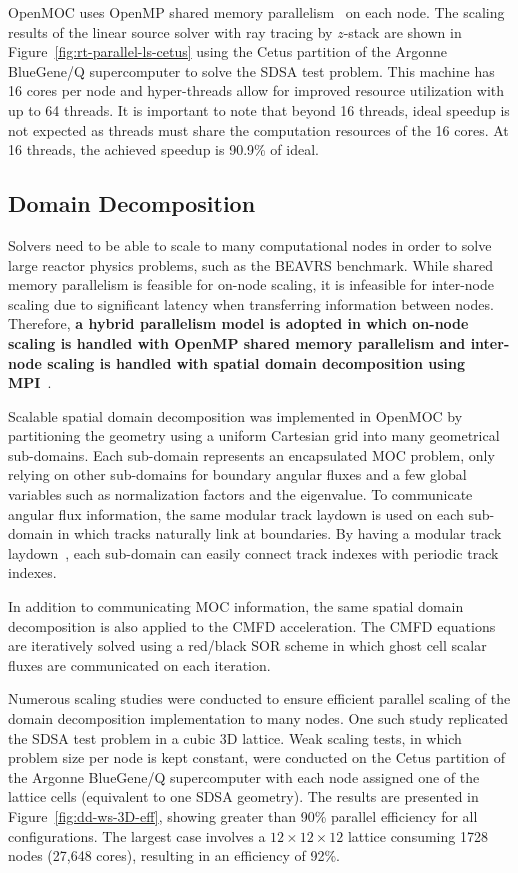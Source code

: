 \documentclass[12pt,twoside]{mitthesis-exec}
\begin{document}
OpenMOC uses OpenMP shared memory parallelism~\cite{openmp} on each node. The scaling results of the linear source solver with ray tracing by $z$-stack are shown in Figure~\ref{fig:rt-parallel-ls-cetus} using the Cetus partition of the Argonne BlueGene/Q supercomputer to solve the SDSA test problem. This machine has 16 cores per node and hyper-threads allow for improved resource utilization with up to 64 threads. It is important to note that beyond 16 threads, ideal speedup is not expected as threads must share the computation resources of the 16 cores. At 16 threads, the achieved speedup is 90.9\% of ideal.


\subsection*{Domain Decomposition}

Solvers need to be able to scale to many computational nodes in order to solve large reactor physics problems, such as the BEAVRS benchmark. While shared memory parallelism is feasible for on-node scaling, it is infeasible for inter-node scaling due to significant latency when transferring information between nodes. Therefore, \textbf{a hybrid parallelism model is adopted in which on-node scaling is handled with OpenMP shared memory parallelism and inter-node scaling is handled with spatial domain decomposition using MPI}~\cite{mpi}.

Scalable spatial domain decomposition was implemented in OpenMOC by partitioning the geometry using a uniform Cartesian grid into many geometrical sub-domains. Each sub-domain represents an encapsulated MOC problem, only relying on other sub-domains for boundary angular fluxes and a few global variables such as normalization factors and the eigenvalue. To communicate angular flux information, the same modular track laydown is used on each sub-domain in which tracks naturally link at boundaries. By having a modular track laydown~\cite{liu_mrt}, each sub-domain can easily connect track indexes with periodic track indexes.

In addition to communicating MOC information, the same spatial domain decomposition is also applied to the CMFD acceleration. The CMFD equations are iteratively solved using a red/black SOR scheme in which ghost cell scalar fluxes are communicated on each iteration.

Numerous scaling studies were conducted to ensure efficient parallel scaling of the domain decomposition implementation to many nodes. One such study replicated the SDSA test problem in a cubic 3D lattice. Weak scaling tests, in which problem size per node is kept constant, were conducted on the Cetus partition of the Argonne BlueGene/Q supercomputer with each node assigned one of the lattice cells (equivalent to one SDSA geometry). The results are presented in Figure~\ref{fig:dd-ws-3D-eff}, showing greater than 90\% parallel efficiency for all configurations. The largest case involves a $12 \times 12 \times 12$ lattice consuming 1728 nodes (27,648 cores), resulting in an efficiency of 92\%.
\end{document}
